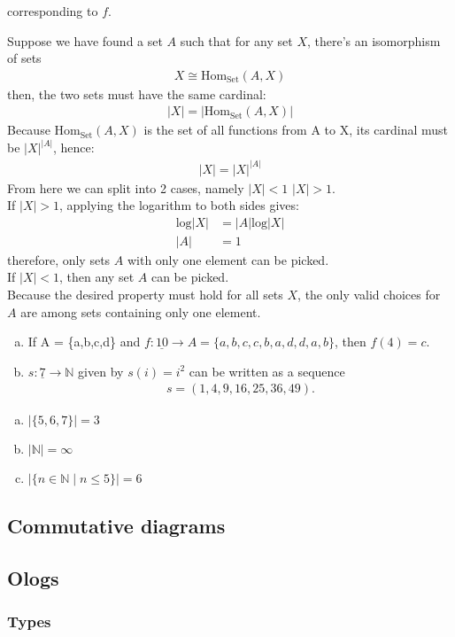 \documentclass[12pt]{article}
\theoremstyle{remark}
\theoremstyle{definition}
\def\sexc{\begin{enumerate}[a.)]\setlength{\itemsep}{.1cm}\setlength{\parskip}{.1cm}\item}
\def\next{\item}
\def\endsexc{\end{enumerate}}
\begin{document}
\begin{large}
\begin{Exercise}
\end{Exercise} corresponding to $f$.
\begin{Exercise}
Suppose we have found a set $A$ such that for any set $X$, there's an isomorphism of sets
\begin{align*}X \cong \text{Hom}_\text{Set}(A,X)
\end{align*}
then, the two sets must have the same cardinal:
\begin{align*}|X| = |\text{Hom}_\text{Set}(A,X)|
\end{align*}
Because $\text{Hom}_\text{Set}(A,X)$ is the set of all functions from A to X, its cardinal must be $|X|^{|A|}$, hence:
\begin{align*}
|X| = |X|^{|A|}
\end{align*}
From here we can split into 2 cases, namely $|X|<1$  $|X|>1$.\\
If $|X|>1$, applying the logarithm to both sides gives:
\begin{align*}
\text{log}|X| &= |A|{\text{log}|X|}\\
 |A| &= 1
\end{align*}
therefore, only sets $A$ with only one element can be picked.\\
If $|X|<1$, then any set $A$ can be picked.\\
Because the desired property must hold for all sets $X$, the only valid choices for $A$ are among sets containing only one element.
\end{Exercise}
\begin{Exercise}
\sexc
If A = \{a,b,c,d\} and $f:\underline{10}\rightarrow A = \{a,b,c,c,b,a,d,d,a,b\}$, then $f(4)=c$.
\next
$s:\underline{7}\rightarrow\mathbb{N}$ given by $s(i)=i^2$ can be written as a sequence 
\begin{align*}
s =(1,4,9,16,25,36,49).
\end{align*}
\endsexc
\end{Exercise}
\begin{Exercise}
\sexc
$|\{5,6,7\}|=3$
\next
$|\mathbb{N}|=\infty$
\next 
$|\{n \in \mathbb{N} \mid n \leq 5\}| = 6$
\endsexc
\end{Exercise}
\subsection{Commutative diagrams}
\subsection{Ologs}
\subsubsection{Types}

\end{large}
\end{document}
